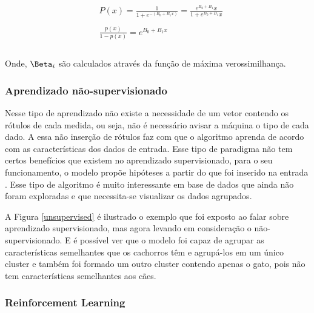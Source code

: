           \begin{equation}\label{eq:LogReg1}
            \begin{aligned}
              & P(x) = \frac{1}{1+e^{-(B_{0}+B_{1}x)}} = \frac{e^{B_{0} + B_{1}}x}{1+e^{B_{0}+B_{1}}x }\\ \\
              & \frac{p(x)}{1-p(x)} = e^{B_{0}+B_{1}x}\\ \\
          \end{aligned} 
          \end{equation}
         
          Onde, $\Beta_{i}$ são calculados através da função de máxima verossimilhança. 

    \subsubsection{Aprendizado não-supervisionado}

          Nesse tipo de aprendizado não existe a necessidade de um vetor contendo os rótulos de cada medida, ou seja, não é 
          necessário avisar a máquina o tipo de cada dado. A essa não inserção de rótulos faz com que o algoritmo aprenda de acordo 
          com as características dos dados de entrada. Esse tipo de paradigma não tem certos benefícios que existem  no aprendizado supervisionado, 
          para o seu funcionamento, o modelo propõe hipóteses a partir do que foi inserido na entrada \cite{bonaccorso2017machine}. Esse tipo de algoritmo 
          é muito interessante em base de dados que ainda não foram exploradas e que necessita-se visualizar os dados agrupados.

          A Figura \ref{unsupervised} é ilustrado o exemplo que foi exposto ao falar sobre aprendizado supervisionado, mas agora levando em consideração o 
          não-supervisionado. E é possível ver que o modelo foi capaz de agrupar as características semelhantes que os cachorros têm e agrupá-los em um
          único cluster e também foi formado um outro cluster contendo apenas o gato, pois não tem características semelhantes aos cães.

    \subsubsection{Reinforcement Learning}


